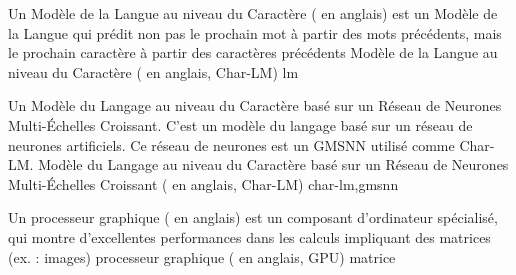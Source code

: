 {%
	{Un Modèle de la Langue au niveau du Caractère ( en anglais) est un Modèle de la Langue qui prédit non pas le prochain mot à partir des mots précédents, mais le prochain caractère à partir des caractères précédents}
}{Modèle de la Langue au niveau du Caractère ( en anglais, Char-LM)}
{lm}

{%
	Un Modèle du Langage au niveau du Caractère basé sur un Réseau de Neurones 
	Multi-Échelles Croissant. C'est un modèle du langage basé sur un réseau de 
	neurones artificiels. Ce réseau de neurones est un GMSNN utilisé comme Char-LM.}
{Modèle du Langage au niveau du Caractère basé sur un Réseau de Neurones Multi-Échelles Croissant ( en anglais, Char-LM)}
{char-lm,gmsnn}

{%
	Un processeur graphique ( en anglais) est un composant d'ordinateur spécialisé, qui montre d'excellentes performances dans les calculs impliquant des matrices (ex. : images)
}{processeur graphique ( en anglais, GPU)}
{matrice}
